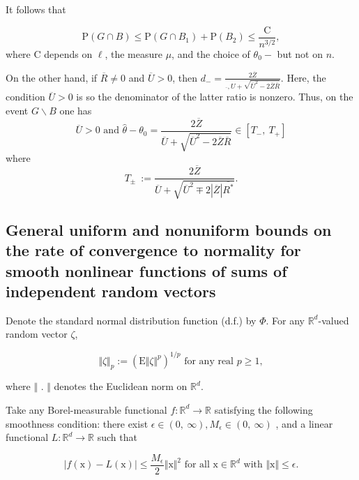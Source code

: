 It follows that 

\begin{equation}\label{GandB}
\mathrm{P}(G\cap B)\leq \mathrm{P}(G\cap B_{1})+\mathrm{P}(B_{2})\leq\frac{\mathrm{C}}{n^{3/2}}, 
\end{equation}
where $\mathrm{C}$ depends on $\ell$, the measure $\mu$, and the choice of $\theta_{0}-$ but not on $n.$


On the other hand, if $\overline{R}\neq 0$ and $\overline{U}>0$, then $d_{-}=\displaystyle \frac{2\overline{Z}}{\overline{},U+\sqrt{\overline{U}^{2}-2\overline{Z}\overline{R}}}$. Here, the condition $\overline{U}>0$ is so the denominator of the latter ratio is nonzero. Thus, on the event $G\backslash B$ one has
\begin{equation}\label{inclusionrelation}
\overline{U}>0 \textrm{ and } \displaystyle \hat{\theta}-\theta_{0}=\frac{2\overline{Z}}{\overline{U}+\sqrt{\overline{U}^{2}-2\overline{Z}\overline{R}}}\in[T_{-},\ T_{+}]
\end{equation}
where
\begin{equation}\label{Tpm}
T_{\pm}\ :=\frac{2\overline{Z}}{\overline{U}+\sqrt{\overline{U}^{2}\mp 2|\overline{Z}|\overline{R^{*}}}
}.
\end{equation}

\medskip

\subsection*{General uniform and nonuniform bounds on the rate of convergence to normality for smooth nonlinear functions of sums of independent random vectors}

Denote the standard normal distribution function (d.f.) by $\Phi$. For any $\mathbb{R}^{d}$-valued random vector $\zeta$,

\[
\Vert\zeta\Vert_{p} :=(\mathrm{E}\Vert\zeta\Vert^{p})^{1/p} \textrm{ for any real } p\geq 1,
\]

where $\Vert$ . $\Vert$ denotes the Euclidean norm on $\mathbb{R}^{d}.$

Take any Borel-measurable functional $f:\mathbb{R}^{d}\rightarrow \mathbb{R}$ satisfying the following smoothness condition: there exist $\epsilon\in(0,\ \infty), M_{\epsilon}\in(0,\ \infty)$ , and a linear functional $L:\mathbb{R}^{d}\rightarrow \mathbb{R}$ such that

\begin{theorem}
	\begin{equation}\label{eqn:smoothness}
	|f(\displaystyle \mathrm{x})-L(\mathrm{x})|\leq\frac{M_{\epsilon}}{2}\Vert \mathrm{x}\Vert^{2} \textrm{ for all } \mathrm{x}\in \mathbb{R}^{d} \textrm{ with } \Vert \mathrm{x}\Vert\leq\epsilon .
	\end{equation}
	
\end{theorem}

